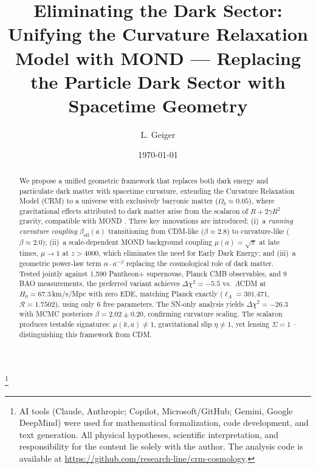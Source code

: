 \documentclass[aps,prd,twocolumn,superscriptaddress,nofootinbib]{revtex4-2}
\begin{document}

\title{Eliminating the Dark Sector: Unifying the Curvature Relaxation Model with MOND --- Replacing the Particle Dark Sector with Spacetime Geometry}

\author{L. Geiger}

\date{\today}

\begin{abstract}
We propose a unified geometric framework that replaces both dark energy and particulate dark matter with spacetime curvature, extending the Curvature Relaxation Model (CRM) \cite{Geiger2026} to a universe with exclusively baryonic matter ($\Omega_b \approx 0.05$), where gravitational effects attributed to dark matter arise from the scalaron of $R + 2\gamma R^2$ gravity, compatible with MOND \cite{Milgrom1983}. Three key innovations are introduced: (i)~a \textit{running curvature coupling} $\beta_{\mathrm{eff}}(a)$ transitioning from CDM-like ($\beta \approx 2.8$) to curvature-like ($\beta \approx 2.0$); (ii)~a scale-dependent MOND background coupling $\mu(a) = \sqrt{\pi}$ at late times, $\mu \to 1$ at $z > 4000$, which eliminates the need for Early Dark Energy; and (iii)~a geometric power-law term $\alpha \cdot a^{-\beta}$ replacing the cosmological role of dark matter. Tested jointly against 1,590 Pantheon+ supernovae, Planck CMB observables, and 9 BAO measurements, the preferred variant achieves $\Delta\chi^2 = -5.5$ vs.\ $\Lambda$CDM at $H_0 = 67.3$\,km/s/Mpc with zero EDE, matching Planck exactly ($\ell_A = 301.471$, $\mathcal{R} = 1.7502$), using only 6 free parameters. The SN-only analysis yields $\Delta\chi^2 = -26.3$ with MCMC posteriors $\beta = 2.02 \pm 0.20$, confirming curvature scaling. The scalaron produces testable signatures: $\mu(k,a) \neq 1$, gravitational slip $\eta \neq 1$, yet lensing $\Sigma = 1$ -- distinguishing this framework from CDM.
\end{abstract}


\thanks{AI tools (Claude, Anthropic; Copilot, Microsoft/GitHub; Gemini, Google DeepMind) were used for mathematical formalization, code development, and text generation. All physical hypotheses, scientific interpretation, and responsibility for the content lie solely with the author. The analysis code is available at \url{https://github.com/research-line/crm-cosmology}.}
\end{document}
